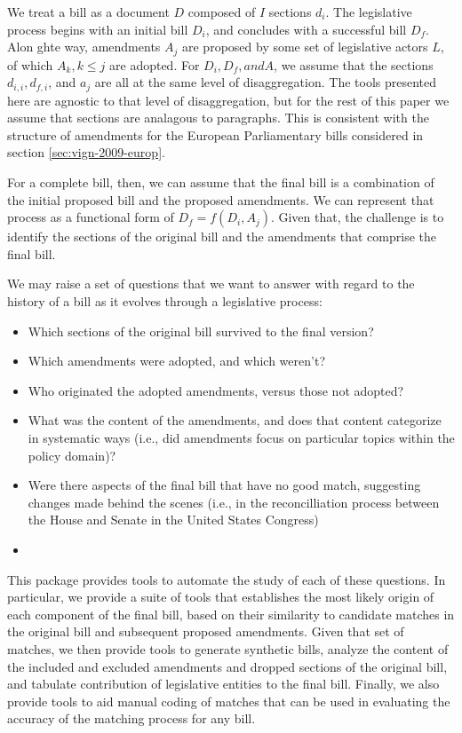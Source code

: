 \documentclass[11pt]{article}
\begin{document}
We treat a bill as a document $D$ composed of $I$ sections $d_i$. The
legislative process begins with an initial bill $D_i$, and concludes
with a successful bill $D_f$. Alon ghte way, amendments $A_j$ are
proposed by some set of legislative actors $L$, of which $A_k, k \leq
j$ are adopted. For $D_i, D_f, and A$, we assume that the sections
$d_{i,i}, d_{f,i}$, and $a_j$ are all at the same level of
disaggregation. The tools presented here are agnostic to that level of
disaggregation, but for the rest of this paper we assume that sections
are analagous to paragraphs. This is consistent with the structure of
amendments for the European Parliamentary bills considered in section
\ref{sec:vign-2009-europ}.

For a complete bill, then, we can assume that the final bill is a
combination of the initial proposed bill and the proposed
amendments. We can represent that process as a functional form of $D_f
= f(D_i, A_j)$. Given that, the challenge is to identify the sections
of the original bill and the amendments that comprise the final
bill. 

We may raise a set of questions that we want to answer with regard to
the history of a bill as it evolves through a legislative process:
\begin{itemize}
\item Which sections of the original bill survived to the final version?
\item Which amendments were adopted, and which weren't?
\item Who originated the adopted amendments, versus those not adopted?
\item What was the content of the amendments, and does that content
  categorize in systematic ways (i.e., did amendments focus on
  particular topics within the policy domain)?
\item Were there aspects of the final bill that have no good match,
  suggesting changes made behind the scenes (i.e., in the
  reconcilliation process between the House and Senate in the United States Congress)
\item 
\end{itemize}

This package provides tools to automate the study of each of these
questions. In particular, we provide a suite of tools that establishes
the most likely origin of each component of the final bill, based on
their similarity to candidate matches in the original bill and
subsequent proposed amendments. Given that set of matches, we then
provide tools to generate synthetic bills, analyze the content of
the included and excluded amendments and dropped sections of the
original bill, and tabulate contribution of legislative entities to the
final bill. Finally, we also provide tools to aid manual coding of
matches that can be used in evaluating the accuracy of the matching
process for any bill. 
\end{document}

